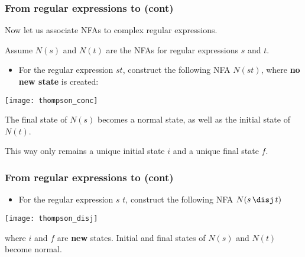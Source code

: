 %
\begin{frame}
\frametitle{From regular expressions to  (cont)}

Now let us associate NFAs to complex regular expressions.

\bigskip

Assume \(N(s)\) and \(N(t)\) are the NFAs for regular expressions
\(s\) and \(t\).
\begin{itemize}

  \item For the regular expression \(st\), construct the following NFA
    \(N(st)\), where \textbf{no new state} is created:

\end{itemize}

\begin{center}
\texttt{[image: thompson\_conc]}
\end{center}
The final state of \(N(s)\) becomes a normal state, as well as the
initial state of \(N(t)\).

\bigskip

This way only remains a unique initial state \(i\) and a unique final
state \(f\).

\end{frame}

%
\begin{frame}
\frametitle{From regular expressions to  (cont)}

\begin{itemize}

  \item For the regular expression \(s\) \disj \(t\), construct the
  following NFA \(N(s \, \text{\disj} \, t)\)

\end{itemize}
\begin{center} 
\texttt{[image: thompson\_disj]}
\end{center}
where \(i\) and \(f\) are \textbf{new} states. Initial and final
states of \(N(s)\) and \(N(t)\) become normal.

\end{frame}

